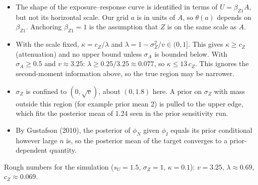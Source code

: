 \documentclass[11pt]{article}
\begin{document}
\begin{itemize}
\item The shape of the exposure--response curve is identified in terms of $U = \beta_{Z1}A$, but not its horizontal scale. Our grid $a$ is in units of $A$, so $\theta(a)$ depends on $\beta_{Z1}$. Anchoring $\beta_{Z1} = 1$ is the assumption that $Z$ is on the same scale as $A$.
\item With the scale fixed, $\kappa = c_Z/\lambda$ and $\lambda = 1 - \sigma_Z^2/v \in (0, 1]$. This gives $\kappa \ge c_Z$ (attenuation) and no upper bound unless $\sigma_A$ is bounded below. With $\sigma_A \ge 0.5$ and $v \approx 3.25$: $\lambda \ge 0.25/3.25 \approx 0.077$, so $\kappa \le 13\,c_Z$. This ignores the second-moment information above, so the true region may be narrower.
\item $\sigma_Z$ is confined to $(0, \sqrt{v})$, about $(0, 1.8)$ here. A prior on $\sigma_Z$ with mass outside this region (for example prior mean 2) is pulled to the upper edge, which fits the posterior mean of 1.24 seen in the prior sensitivity run.
\item By Gustafson (2010), the posterior of $\phi_N$ given $\phi_I$ equals its prior conditional however large $n$ is, so the posterior mean of the target converges to a prior-dependent quantity.
\end{itemize}

Rough numbers for the simulation ($s_U = 1.5$, $\sigma_Z = 1$, $\kappa = 0.1$): $v = 3.25$, $\lambda \approx 0.69$, $c_Z \approx 0.069$.
\end{document}
